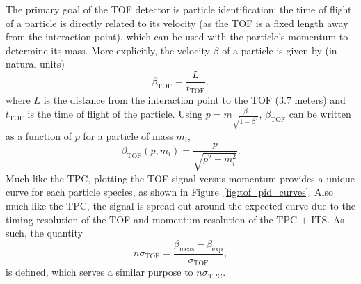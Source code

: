 The primary goal of the TOF detector is particle identification: the time of flight of a particle is directly related to its velocity (as the TOF is a fixed length away from the interaction point), which can be used with the particle's momentum to determine its mass. More explicitly, the velocity $\beta$ of a particle is given by (in natural units)
\begin{equation}
    \beta_{\text{TOF}} = \frac{L}{t_{\text{TOF}}},
\end{equation}
where $L$ is the distance from the interaction point to the TOF (3.7 meters) and $t_{\text{TOF}}$ is the time of flight of the particle. Using $p =  m \frac{\beta}{\sqrt{1-\beta^2}}$, $\beta_{\text{TOF}}$ can be written as a function of $p$ for a particle of mass $m_i$,
\begin{equation}
    \beta_{\text{TOF}}(p, m_i) = \frac{p}{\sqrt{p^2 + m_i^2}}.
\end{equation}
Much like the TPC, plotting the TOF signal versus momentum provides a unique curve for each particle species, as shown in Figure~\ref{fig:tof_pid_curves}. Also much like the TPC, the signal is spread out around the expected curve due to the timing resolution of the TOF and momentum resolution of the TPC $+$ ITS. As such, the quantity
\begin{equation}
n\sigma_{\text{TOF}} = \frac{\beta_{\text{meas}} - \beta_{\text{exp}}}{\sigma_{\text{TOF}}},
\end{equation}
is defined, which serves a similar purpose to $n\sigma_{\text{TPC}}$.



